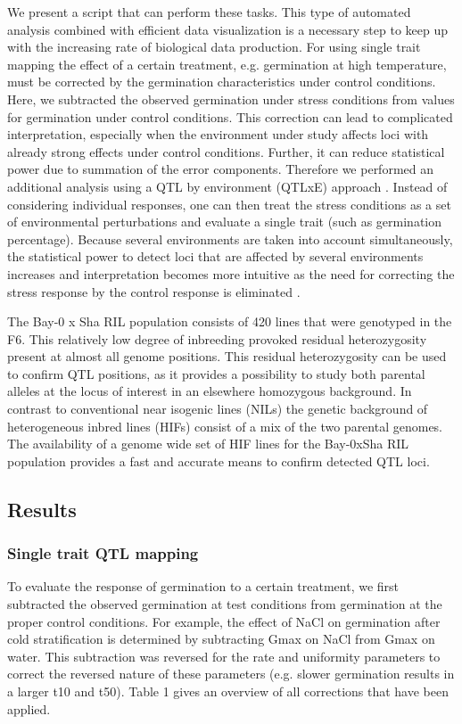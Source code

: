 We present a script that can perform these tasks. This type of automated analysis combined with 
efficient data visualization is a necessary step to keep up with the increasing rate of biological 
data production. For using single trait mapping the effect of a certain treatment, e.g. germination 
at high temperature, must be corrected by the germination characteristics under control conditions. 
Here, we subtracted the observed germination under stress conditions from values for germination 
under control conditions. This correction can lead to complicated interpretation, especially when the 
environment under study affects loci with already strong effects under control conditions. Further, 
it can reduce statistical power due to summation of the error components. Therefore we performed an 
additional analysis using a QTL by environment (QTLxE) approach \cite{Vargas:2006, Moreau:2004}. 
Instead of considering individual responses, one can then treat the stress conditions as a set of 
environmental perturbations and evaluate a single trait (such as germination percentage). Because 
several environments are taken into account simultaneously, the statistical power to detect loci 
that are affected by several environments increases and interpretation becomes more intuitive as the 
need for correcting the stress response by the control response is eliminated \cite{Boer:2007}.

The Bay-0 x Sha RIL population consists of 420 lines that were genotyped in the F6. This relatively 
low degree of inbreeding provoked residual heterozygosity present at almost all genome positions. 
This residual heterozygosity can be used to confirm QTL positions, as it provides a possibility to 
study both parental alleles at the locus of interest in an elsewhere homozygous background. 
In contrast to conventional near isogenic lines (NILs) the genetic background of heterogeneous 
inbred lines (HIFs) consist of a mix of the two parental genomes. The availability of a genome wide 
set of HIF lines for the Bay-0xSha RIL population provides a fast and accurate means to confirm 
detected QTL loci.

\subsection{Results}

\subsubsection{Single trait QTL mapping}
To evaluate the response of germination to a certain treatment, we first subtracted the observed 
germination at test conditions from germination at the proper control conditions. For example, the 
effect of NaCl on germination after cold stratification is determined by subtracting Gmax on 
NaCl from Gmax on water. This subtraction was reversed for the rate and uniformity parameters to 
correct the reversed nature of these parameters (e.g. slower germination results in a larger t10 
and t50). Table 1 gives an overview of all corrections that have been applied. 


